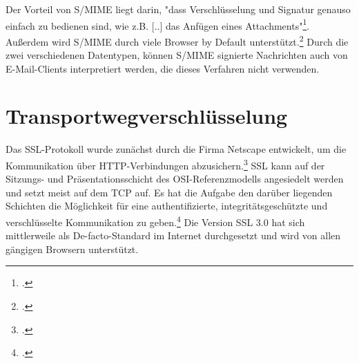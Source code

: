\documentclass  [paper=a4,
				fontsize=12pt,
				listof=totoc,
				bibliography=totoc
				]{scrreprt}
\begin{document}
				Der Vorteil von \ac{S/MIME} liegt darin, "dass Verschlüsselung und Signatur genauso einfach zu bedienen sind, wie z.B. [..] das Anfügen eines Attachments"\footcite[Vgl.][S. 61]{Schwenk}. Außerdem wird \ac{S/MIME} durch viele Browser by Default unterstützt.\footcite[Vgl.][]{Duevel}
				Durch die zwei verschiedenen Datentypen, können \ac{S/MIME} signierte Nachrichten auch von E-Mail-Clients interpretiert werden, die dieses Verfahren nicht verwenden. 
				\medskip
				
				\newpage
				
				
		\section{Transportwegverschlüsselung}
			Das \ac{SSL}-Protokoll wurde zunächst durch die Firma Netscape entwickelt, um die Kommunikation über \ac{HTTP}-Verbindungen abzusichern.\footcite[Vgl.][S. 796]{Eckert2013} \ac{SSL} kann auf der Sitzungs- und Präsentationsschicht des \ac{OSI}-Referenzmodells angesiedelt werden und setzt meist auf dem \ac{TCP} auf. Es hat die Aufgabe den darüber liegenden Schichten die Möglichkeit für eine authentifizierte, integritätsgeschützte und verschlüsselte Kommunikation zu geben.\footcite[Vgl.][S. 799 ff.]{Eckert2013}
			Die Version \ac{SSL} 3.0 hat sich mittlerweile als De-facto-Standard im Internet durchgesetzt und wird von allen gängigen Browsern unterstützt.\\
		
\end{document}
